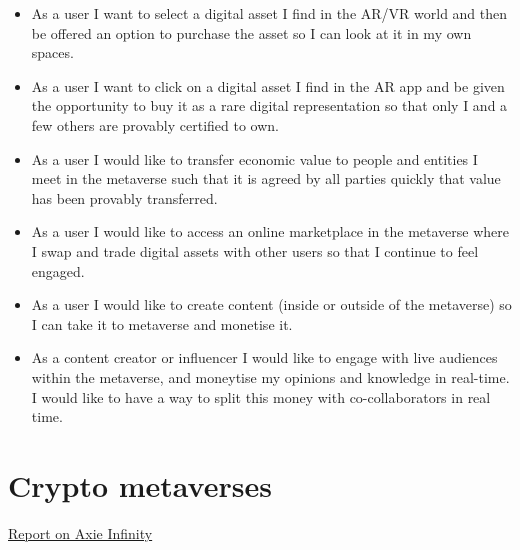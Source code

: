 \label{behaviours}
\begin{itemize}
\item As a user I want to select a digital asset I find in the AR/VR world and then be offered an option to purchase the asset so I can look at it in my own spaces.
\item As a user I want to click on a digital asset I find in the AR app and be given the opportunity to buy it as a rare digital representation so that only I and a few others are provably certified to own.
\item As a user I would like to transfer economic value to people and entities I meet in the metaverse such that it is agreed by all parties quickly that value has been provably transferred.
\item As a user I would like to access an online marketplace in the metaverse where I swap and trade digital assets with other users so that I continue to feel engaged.
\item As a user I would like to create content (inside or outside of the metaverse) so I can take it to metaverse and monetise it.
\item As a content creator or influencer I would like to engage with live audiences within the metaverse, and moneytise my opinions and knowledge in real-time. I would like to have a way to split this money with co-collaborators in real time.
\end{itemize}
\section{Crypto metaverses}

\href{https://naavik.co/business-breakdowns/axie-infinity/#axie-decon=}{Report on Axie Infinity}

